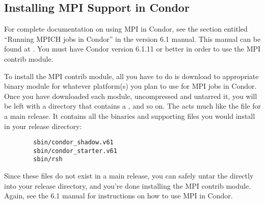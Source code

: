 \subsection{\label{sec:Install-MPI-Condor}
Installing MPI Support in Condor} 


For complete documentation on using MPI in Condor, see the section
entitled ``Running MPICH jobs in Condor'' in the version 6.1 manual.
This manual can be found at
.
You must have Condor version 6.1.11 or better in order to use the MPI
contrib module.  

To install the MPI contrib module, all you have to do is download
to appropriate binary module for whatever platform(s) you plan to use
for MPI jobs in Condor.
Once you have downloaded each module, uncompressed and untarred it, you
will be left with a directory that contains a ,
 and so on.
The  acts much like the  file for a
main release. 
It contains all the binaries and supporting files you would install in
your release directory:
\begin{verbatim}
        sbin/condor_shadow.v61
        sbin/condor_starter.v61
        sbin/rsh
\end{verbatim}

Since these files do not exist in a main release, you can safely untar
the  directly into your release directory, and you're
done installing the MPI contrib module.
Again, see the 6.1 manual for instructions on how to use MPI in
Condor.

